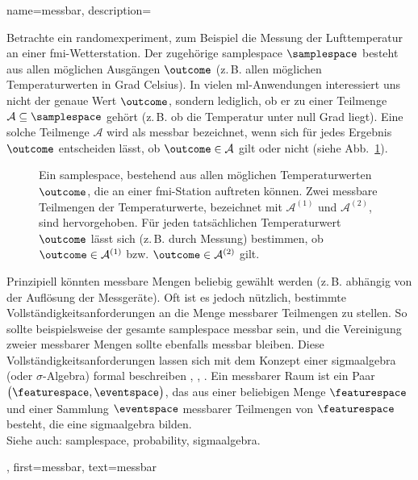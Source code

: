 {{{{
{name={messbar}, 
	description={Betrachte ein \gls{randomexperiment}, 
	zum Beispiel die Messung der Lufttemperatur an einer \gls{fmi}-Wetterstation. 
	Der zugehörige \gls{samplespace} $\samplespace$ besteht aus allen möglichen 
	Ausgängen $\outcome$ (z.\,B. allen möglichen Temperaturwerten in Grad Celsius). 
	In vielen \gls{ml}-Anwendungen interessiert uns nicht der genaue Wert $\outcome$, 
	sondern lediglich, ob er zu einer Teilmenge $\mathcal{A} \subseteq \samplespace$ 
	gehört (z.\,B. ob die Temperatur unter null Grad liegt). 
	Eine solche Teilmenge $\mathcal{A}$ wird als messbar bezeichnet, 
	wenn sich für jedes Ergebnis $\outcome$ entscheiden lässt, ob $\outcome \in \mathcal{A}$ gilt oder nicht 
	(siehe Abb.\ \ref{fig_measurable_dict}).\\[1ex]
	\begin{figure}[H]
	\begin{center}
	\end{center}
	\caption{Ein \gls{samplespace}, bestehend aus allen möglichen Temperaturwerten $\outcome$, 
	die an einer \gls{fmi}-Station auftreten können. Zwei messbare Teilmengen der Temperaturwerte, 
	bezeichnet mit $\mathcal{A}^{(1)}$ und $\mathcal{A}^{(2)}$, sind hervorgehoben. 
	Für jeden tatsächlichen Temperaturwert $\outcome$ lässt sich (z.\,B. durch Messung) bestimmen, 
	ob $\outcome \in \mathcal{A}^{(1)}$ bzw. $\outcome \in \mathcal{A}^{(2)}$ gilt. \label{fig_measurable_dict}} 
	\end{figure}
	Prinzipiell könnten messbare Mengen beliebig gewählt werden (z.\,B. abhängig von der Auflösung der Messgeräte). 
	Oft ist es jedoch nützlich, bestimmte Vollständigkeitsanforderungen an die Menge messbarer Teilmengen zu stellen. 
	So sollte beispielsweise der gesamte \gls{samplespace} messbar sein, und die Vereinigung zweier messbarer Mengen 
	sollte ebenfalls messbar bleiben. Diese Vollständigkeitsanforderungen lassen sich mit dem Konzept einer 
	\gls{sigmaalgebra} (oder $\sigma$-Algebra) formal beschreiben \cite{RudinBook}, \cite{BillingsleyProbMeasure}, 
	\cite{durrett2010probability}. 
	Ein messbarer Raum ist ein Paar $\big(\featurespace,\eventspace\big)$, das aus einer beliebigen Menge 
	$\featurespace$ und einer Sammlung $\eventspace$ messbarer Teilmengen von $\featurespace$ besteht, 
	die eine \gls{sigmaalgebra} bilden. 
	\\
	Siehe auch: \gls{samplespace}, \gls{probability}, \gls{sigmaalgebra}.},
	first={messbar},
	text={messbar} 
}

}}}}
